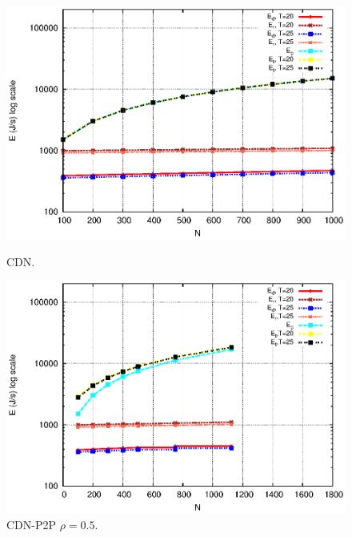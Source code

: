 \documentclass[conference]{IEEEtran}
\begin{document}
\begin{figure}[ht]
\centering
\begin{minipage}[b]{0.4\linewidth}
	\includegraphics[scale=0.5]{graphs/cdn.eps}
	\caption{CDN.}
	\label{fig:4-0}
\end{minipage}
\hfill
\begin{minipage}[b]{0.4\linewidth}
	\includegraphics[scale=0.5]{graphs/cdnp2p-2.eps}
	\caption{CDN-P2P $\rho=0.5$.}
	\label{fig:4-2}
\end{minipage}
\hfill
\begin{minipage}[b]{0.4\linewidth}

\end{minipage}
\end{figure}
\end{document}

